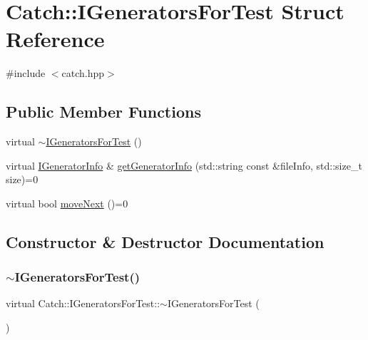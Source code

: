 \hypertarget{struct_catch_1_1_i_generators_for_test}{}\section{Catch\+:\+:I\+Generators\+For\+Test Struct Reference}
\label{struct_catch_1_1_i_generators_for_test}


{\ttfamily \#include $<$catch.\+hpp$>$}

\subsection*{Public Member Functions}
\begin{DoxyCompactItemize}
\item 
virtual \mbox{\hyperlink{struct_catch_1_1_i_generators_for_test_a05725e76ee92e498f73479a61f3e3c7c}{$\sim$\+I\+Generators\+For\+Test}} ()
\item 
virtual \mbox{\hyperlink{struct_catch_1_1_i_generator_info}{I\+Generator\+Info}} \& \mbox{\hyperlink{struct_catch_1_1_i_generators_for_test_a180d84e858840188e4c3788e47eefdb0}{get\+Generator\+Info}} (std\+::string const \&file\+Info, std\+::size\+\_\+t size)=0
\item 
virtual bool \mbox{\hyperlink{struct_catch_1_1_i_generators_for_test_adab31832d529fc584fd63164e0a1c8ad}{move\+Next}} ()=0
\end{DoxyCompactItemize}


\subsection{Constructor \& Destructor Documentation}
\mbox{\label{struct_catch_1_1_i_generators_for_test_a05725e76ee92e498f73479a61f3e3c7c}} 
\subsubsection{\texorpdfstring{$\sim$\+I\+Generators\+For\+Test()}{~IGeneratorsForTest()}}
{\footnotesize\ttfamily virtual Catch\+::\+I\+Generators\+For\+Test\+::$\sim$\+I\+Generators\+For\+Test (\begin{DoxyParamCaption}{ }\end{DoxyParamCaption})\hspace{0.3cm}{\ttfamily [virtual]}}



